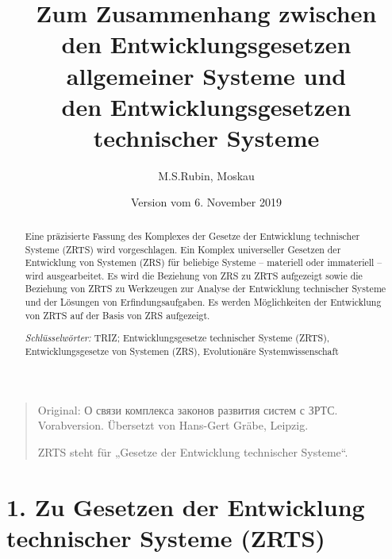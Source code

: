 \documentclass[11pt,a4paper]{article}
\title{Zum Zusammenhang zwischen\\ den Entwicklungsgesetzen allgemeiner
  Systeme und\\ den Entwicklungsgesetzen technischer Systeme}
\author{M.S.Rubin, Moskau}
\date{Version vom 6. November 2019}
\begin{document}
\maketitle
\begin{quote}
  Original: \foreignlanguage{russian}{О связи комплекса законов развития
    систем с ЗРТС}.  Vorabversion. Übersetzt von Hans-Gert Gräbe, Leipzig.

  ZRTS steht für „Gesetze der Entwicklung technischer Systeme“. 
\end{quote}

\begin{abstract}
  Eine präzisierte Fassung des Komplexes der Gesetze der Entwicklung
  technischer Systeme (ZRTS) wird vorgeschlagen.  Ein Komplex universeller
  Gesetzen der Entwicklung von Systemen (ZRS) für beliebige Systeme --
  materiell oder immateriell -- wird ausgearbeitet. Es wird die Beziehung von
  ZRS zu ZRTS aufgezeigt sowie die Beziehung von ZRTS zu Werkzeugen zur
  Analyse der Entwicklung technischer Systeme und der Lösungen von
  Erfindungsaufgaben. Es werden Möglichkeiten der Entwicklung von ZRTS auf der
  Basis von ZRS aufgezeigt.

  \emph{Schlüsselwörter:} TRIZ; Entwicklungsgesetze technischer Systeme
  (ZRTS), Entwicklungsgesetze von Systemen (ZRS), Evolutionäre
  Systemwissenschaft
\end{abstract}

\section*{1. Zu Gesetzen der Entwicklung technischer Systeme (ZRTS)}
\end{document}

